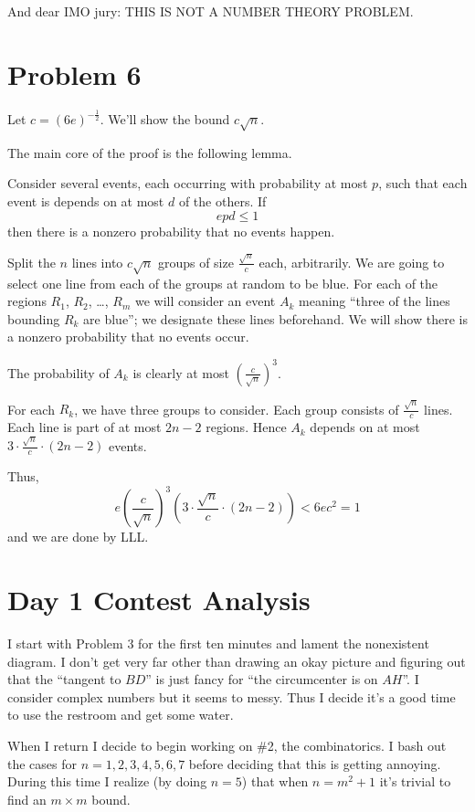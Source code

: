 \documentclass[11pt]{scrreprt}
\numberwithin{figure}{chapter}
\begin{document}
And dear IMO jury: THIS IS NOT A NUMBER THEORY PROBLEM.


\section{Problem 6}
Let $c = (6e)^{-\frac12}$. We'll show the bound $c \sqrt n$.

The main core of the proof is the following lemma.
\begin{lemma*}
  Consider several events, each occurring with probability at most $p$, such that
  each event is depends on at most $d$ of the others. If \[ epd \le 1 \]
  then there is a nonzero probability that no events happen.
\end{lemma*}
Split the $n$ lines into $c \sqrt n$ groups of size $\frac{\sqrt n}{c}$ each, arbitrarily.
We are going to select one line from each of the groups at random to be blue.
For each of the regions $R_1$, $R_2$, \dots, $R_m$ we will consider an event $A_k$ meaning ``three of the lines bounding $R_k$ are blue'';
we designate these lines beforehand.
We will show there is a nonzero probability that no events occur.

The probability of $A_k$ is clearly at most $\left( \frac{c}{\sqrt n} \right)^3$.

For each $R_k$, we have three groups to consider. Each group consists of $\frac{\sqrt n}{c}$ lines. Each line is part of at most $2n-2$ regions.
Hence $A_k$ depends on at most $3 \cdot \frac{\sqrt n}{c} \cdot (2n-2)$ events.

Thus,
\[ e \left( \frac{c}{\sqrt n} \right)^3 \left( 3 \cdot \frac{\sqrt{n}}{c} \cdot (2n-2) \right)
  < 6ec^2 = 1 \]
and we are done by LLL.


\section{Day 1 Contest Analysis}
I start with Problem 3 for the first ten minutes and lament the nonexistent diagram. I don't get very far other than drawing an okay picture and figuring out that the ``tangent to $BD$'' is just fancy for ``the circumcenter is on $AH$''.
I consider complex numbers but it seems to messy.
Thus I decide it's a good time to use the restroom and get some water.

When I return I decide to begin working on \#2, the combinatorics.
I bash out the cases for $n=1,2,3,4,5,6,7$ before deciding that this is getting annoying.
During this time I realize (by doing $n=5$) that when $n=m^2+1$ it's trivial to find an $m \times m$ bound.
\end{document}
